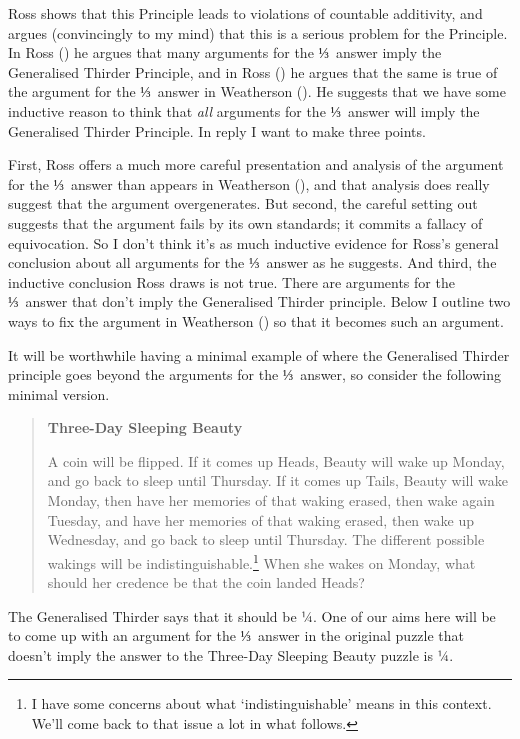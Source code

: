 \documentclass[
  11pt,
  letterpaper,
  DIV=11,
  numbers=noendperiod,
  twoside]{scrartcl}
\begin{document}
Ross shows that this Principle leads to violations of countable
additivity, and argues (convincingly to my mind) that this is a serious
problem for the Principle. In Ross () he
argues that many arguments for the ⅓~answer imply the Generalised
Thirder Principle, and in Ross () he argues
that the same is true of the argument for the ⅓~answer in Weatherson
(). He suggests that we have some
inductive reason to think that \emph{all} arguments for the ⅓~answer
will imply the Generalised Thirder Principle. In reply I want to make
three points.

First, Ross offers a much more careful presentation and analysis of the
argument for the ⅓~answer than appears in Weatherson
(), and that analysis does really
suggest that the argument overgenerates. But second, the careful setting
out suggests that the argument fails by its own standards; it commits a
fallacy of equivocation. So I don't think it's as much inductive
evidence for Ross's general conclusion about all arguments for the
⅓~answer as he suggests. And third, the inductive conclusion Ross draws
is not true. There are arguments for the ⅓~answer that don't imply the
Generalised Thirder principle. Below I outline two ways to fix the
argument in Weatherson () so that it
becomes such an argument.

It will be worthwhile having a minimal example of where the Generalised
Thirder principle goes beyond the arguments for the ⅓~answer, so
consider the following minimal version.

\begin{quote}
\textbf{Three-Day Sleeping Beauty}

A coin will be flipped. If it comes up Heads, Beauty will wake up
Monday, and go back to sleep until Thursday. If it comes up Tails,
Beauty will wake Monday, then have her memories of that waking erased,
then wake again Tuesday, and have her memories of that waking erased,
then wake up Wednesday, and go back to sleep until Thursday. The
different possible wakings will be indistinguishable.\footnote{I have
  some concerns about what `indistinguishable' means in this context.
  We'll come back to that issue a lot in what follows.} When she wakes
on Monday, what should her credence be that the coin landed Heads?
\end{quote}

The Generalised Thirder says that it should be ¼. One of our aims here
will be to come up with an argument for the ⅓~answer in the original
puzzle that doesn't imply the answer to the Three-Day Sleeping Beauty
puzzle is ¼.
\end{document}
